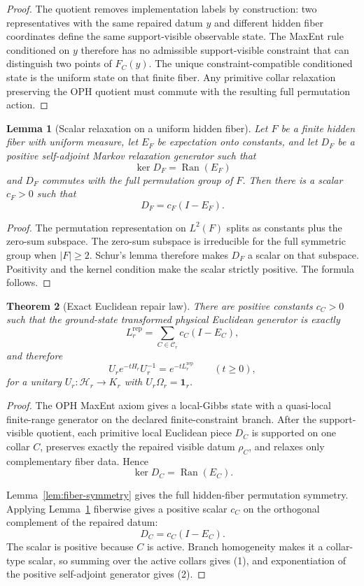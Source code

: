 \documentclass[11pt]{article}
\numberwithin{equation}{section}
\newtheorem{theorem}{Theorem}[section]
\newtheorem{lemma}[theorem]{Lemma}
\theoremstyle{remark}
\newcommand{\Rep}{\mathrm{rep}}
\newcommand{\Hcal}{\mathcal H}
\begin{document}
\begin{proof}
The quotient removes implementation labels by construction: two representatives with the same
repaired datum \(y\) and different hidden fiber coordinates define the same support-visible
observable state. The MaxEnt rule conditioned on \(y\) therefore has no admissible
support-visible constraint that can distinguish two points of \(F_C(y)\). The unique
constraint-compatible conditioned state is the uniform state on that finite fiber. Any primitive
collar relaxation preserving the OPH quotient must commute with the resulting full permutation
action.
\end{proof}

\begin{lemma}[Scalar relaxation on a uniform hidden fiber]
\label{lem:scalar-relaxation}
Let \(F\) be a finite hidden fiber with uniform measure, let \(E_F\) be expectation onto constants,
and let \(D_F\) be a positive self-adjoint Markov relaxation generator such that
\[
\ker D_F=\operatorname{Ran}(E_F)
\]
and \(D_F\) commutes with the full permutation group of \(F\). Then there is a scalar
\(c_F>0\) such that
\[
D_F=c_F(I-E_F).
\]
\end{lemma}

\begin{proof}
The permutation representation on \(L^2(F)\) splits as constants plus the zero-sum subspace.
The zero-sum subspace is irreducible for the full symmetric group when \(|F|\ge2\). Schur's lemma
therefore makes \(D_F\) a scalar on that subspace. Positivity and the kernel condition make the
scalar strictly positive. The formula follows.
\end{proof}

\begin{theorem}[Exact Euclidean repair law]
\label{thm:ec-law}
There are positive constants \(c_C>0\) such that the ground-state transformed physical Euclidean
generator is exactly
\[
L_r^{\Rep}=\sum_{C\in\mathcal C_r} c_C(I-E_C),
\tag{1}
\]
and therefore
\[
U_r e^{-tH_r}U_r^{-1}=e^{-tL_r^{\Rep}}
\qquad(t\ge0),
\tag{2}
\]
for a unitary \(U_r:\Hcal_r\to K_r\) with \(U_r\Omega_r=\mathbf 1_r\).
\end{theorem}

\begin{proof}
The OPH MaxEnt axiom gives a local-Gibbs state with a quasi-local finite-range generator on the
declared finite-constraint branch. After the support-visible quotient, each primitive local
Euclidean piece \(D_C\) is supported on one collar \(C\), preserves exactly the repaired visible
datum \(\rho_C\), and relaxes only complementary fiber data. Hence
\[
\ker D_C=\operatorname{Ran}(E_C).
\]

Lemma~\ref{lem:fiber-symmetry} gives the full hidden-fiber permutation symmetry. Applying
Lemma~\ref{lem:scalar-relaxation} fiberwise gives a positive scalar \(c_C\) on the orthogonal
complement of the repaired datum:
\[
D_C=c_C(I-E_C).
\]
The scalar is positive because \(C\) is active. Branch homogeneity makes it a collar-type scalar,
so summing over the active collars gives (1), and exponentiation of the positive self-adjoint
generator gives (2).
\end{proof}
\end{document}
